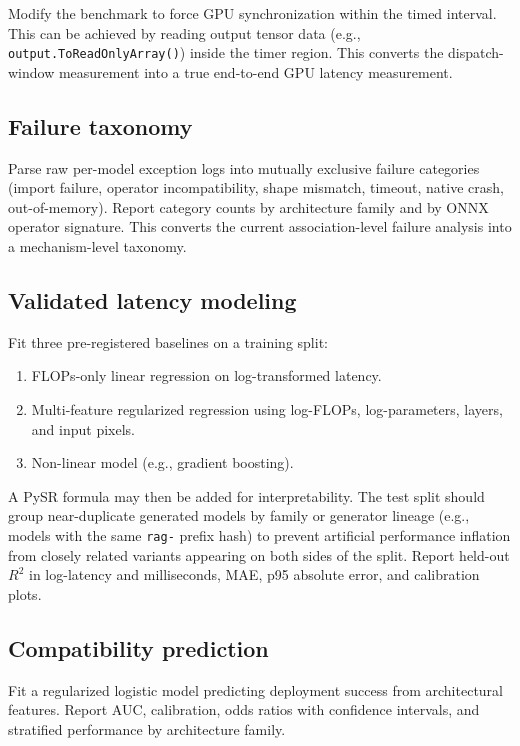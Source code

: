 \documentclass[10pt,twocolumn,letterpaper]{article}
\begin{document}
Modify the benchmark to force GPU synchronization within the timed interval. This can be achieved by reading output tensor data (e.g., \texttt{output.ToReadOnlyArray()}) inside the timer region. This converts the dispatch-window measurement into a true end-to-end GPU latency measurement.

\subsection{Failure taxonomy}

Parse raw per-model exception logs into mutually exclusive failure categories (import failure, operator incompatibility, shape mismatch, timeout, native crash, out-of-memory). Report category counts by architecture family and by ONNX operator signature. This converts the current association-level failure analysis into a mechanism-level taxonomy.

\subsection{Validated latency modeling}

Fit three pre-registered baselines on a training split:
\begin{enumerate}[nosep,leftmargin=*]
  \item FLOPs-only linear regression on log-transformed latency.
  \item Multi-feature regularized regression using log-FLOPs, log-parameters, layers, and input pixels.
  \item Non-linear model (e.g., gradient boosting).
\end{enumerate}
A PySR formula may then be added for interpretability. The test split should group near-duplicate generated models by family or generator lineage (e.g., models with the same \texttt{rag-} prefix hash) to prevent artificial performance inflation from closely related variants appearing on both sides of the split. Report held-out $R^2$ in log-latency and milliseconds, MAE, p95 absolute error, and calibration plots.

\subsection{Compatibility prediction}

Fit a regularized logistic model predicting deployment success from architectural features. Report AUC, calibration, odds ratios with confidence intervals, and stratified performance by architecture family.
\end{document}
